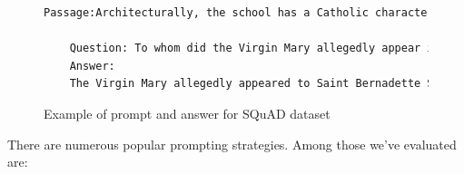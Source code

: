 \documentclass[fleqn,moreauthors,10pt]{ds_report}
\begin{document}
\begin{itemize}
    \begin{figure}[htbp]
    \centering
    \begin{lstlisting}[language=TeX]
    Passage:Architecturally, the school has a Catholic character. Atop the Main Building's gold dome is a golden statue of the Virgin Mary. Immediately in front of the Main Building and facing it, is a copper statue of Christ with arms upraised with the legend "Venite Ad Me Omnes".

    Question: To whom did the Virgin Mary allegedly appear in 1858 in Lourdes France?
    Answer:
    The Virgin Mary allegedly appeared to Saint Bernadette Soubirous in 1858 in Lourdes, France.
    \end{lstlisting}
    \caption{Example of prompt and answer for SQuAD dataset}
    \label{text:squad}
    \end{figure}
    
\end{itemize}

There are numerous popular prompting strategies. Among those we've evaluated are:
\end{document}
